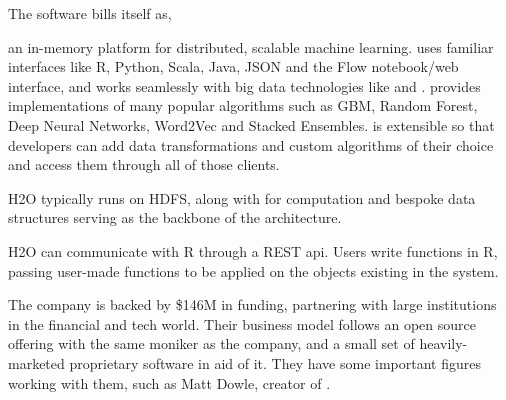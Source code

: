 The  software bills itself as,

\begin{displayquote}
    an in-memory platform for distributed, scalable machine learning. 
    uses familiar interfaces like R, Python, Scala, Java, JSON and the Flow
    notebook/web interface, and works seamlessly with big data technologies
    like  and .  provides implementations of many popular
    algorithms such as GBM, Random Forest, Deep Neural Networks, Word2Vec
    and Stacked Ensembles.  is extensible so that developers can add data
    transformations and custom algorithms of their choice and access them
    through all of those clients.
\end{displayquote}

H2O typically runs on HDFS, along with  for computation and bespoke
data structures serving as the backbone of the architecture.

H2O can communicate with R through a REST api. Users write functions in
R, passing user-made functions to be applied on the objects existing in
the  system\cite{h2o.ai:_h2o}.

The company  is backed by \$146M in funding, partnering with large
institutions in the financial and tech world. Their business model
follows an open source offering with the same moniker as the company,
and a small set of heavily-marketed proprietary software in aid of it.
They have some important figures working with them, such as Matt Dowle,
creator of .
